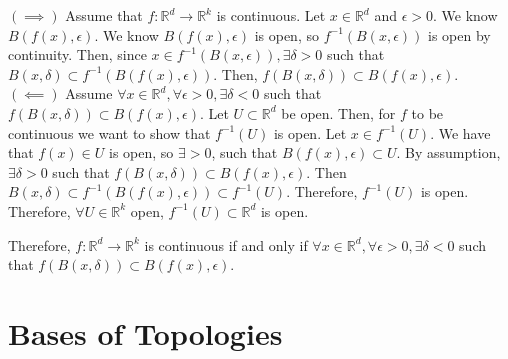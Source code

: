 \begin{myproof}
	$(\implies)$ Assume that $f:\mathbb{R}^d\to\mathbb{R}^k$ is continuous. Let $x\in\mathbb{R}^d$ and $\epsilon>0$. We know $B(f(x),\epsilon)$. We know $B(f(x),\epsilon)$ is open, so $f^{-1}(B(x,\epsilon))$ is open by continuity. Then, since $x\in f^{-1}(B(x,\epsilon)),\exists\delta > 0$ such that $B(x,\delta)\subset f^{-1}(B(f(x),\epsilon))$. Then, $f(B(x,\delta))\subset B(f(x),\epsilon)$. \\ 
	$(\impliedby)$ Assume $\forall x\in\mathbb{R}^d,\forall\epsilon > 0,\exists\delta < 0$ such that $f(B(x,\delta))\subset B(f(x),\epsilon)$. Let $U\subset\mathbb{R}^d$ be open. Then, for $f$ to be continuous we want to show that $f^{-1}(U)$ is open. Let $x\in f^{-1}(U)$. We have that $f(x)\in U$ is open, so $\exists > 0$, such that $B(f(x),\epsilon)\subset U$. By assumption, $\exists\delta>0$ such that $f(B(x,\delta))\subset B(f(x),\epsilon)$. Then $B(x,\delta)\subset f^{-1}(B(f(x),\epsilon))\subset f^{-1}(U)$. Therefore, $f^{-1}(U)$ is open. Therefore, $\forall U\in\mathbb{R}^k$ open, $f^{-1}(U)\subset\mathbb{R}^d$ is open.

	Therefore, $f:\mathbb{R}^d\to\mathbb{R}^k$ is continuous if and only if $\forall x\in\mathbb{R}^d,\forall\epsilon > 0,\exists\delta < 0$ such that $f(B(x,\delta))\subset B(f(x),\epsilon)$.
\end{myproof}



\section{Bases of Topologies}

